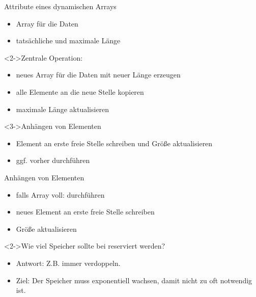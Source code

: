 \begin{frame}
    \begin{block}{Attribute eines dynamischen Arrays}
        \begin{itemize}
            \item Array für die Daten
            \item tatsächliche und maximale Länge
        \end{itemize}
    \end{block}
    \begin{block}<2->{Zentrale Operation: \alert{}}
        \begin{itemize}
            \item neues Array für die Daten mit neuer Länge erzeugen
            \item alle Elemente an die neue Stelle kopieren
            \item maximale Länge aktualisieren
        \end{itemize}
    \end{block}
    \begin{block}<3->{Anhängen von Elementen}
        \begin{itemize}
            \item Element an erste freie Stelle schreiben
                  und Größe aktualisieren
            \item ggf. vorher  durchführen
        \end{itemize}
    \end{block}
\end{frame}

\begin{frame}
    \begin{block}{Anhängen von Elementen}
        \begin{itemize}
            \item falls Array voll:  durchführen
            \item neues Element an erste freie Stelle schreiben
            \item Größe aktualisieren
        \end{itemize}
    \end{block}
    \begin{block}<2->{Wie viel Speicher sollte bei  reserviert werden?}
        \begin{itemize}
            \item<3-> Antwort: Z.B. immer verdoppeln.
            \item<3-> Ziel: Der Speicher muss exponentiell wachsen,
            damit  nicht zu oft notwendig ist.
        \end{itemize}
    \end{block}
\end{frame}
